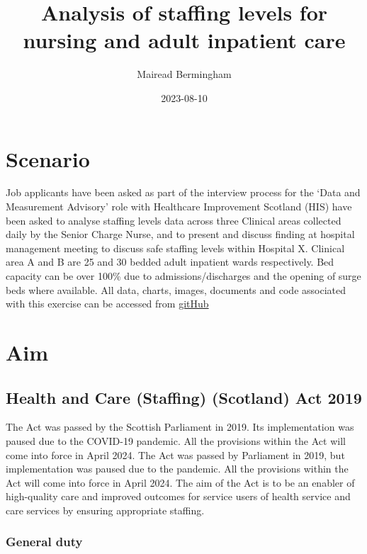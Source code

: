 \documentclass[
]{article}
\title{Analysis of staffing levels for nursing and adult inpatient care}
\author{Mairead Bermingham}
\date{2023-08-10}
\begin{document}
\maketitle

\hypertarget{scenario}{%
\section{Scenario}\label{scenario}}

Job applicants have been asked as part of the interview process for the
`Data and Measurement Advisory' role with Healthcare Improvement
Scotland (HIS) have been asked to analyse staffing levels data across
three Clinical areas collected daily by the Senior Charge Nurse, and to
present and discuss finding at hospital management meeting to discuss
safe staffing levels within Hospital X. Clinical area A and B are 25 and
30 bedded adult inpatient wards respectively. Bed capacity can be over
100\% due to admissions/discharges and the opening of surge beds where
available. All data, charts, images, documents and code associated with
this exercise can be accessed from
\href{https://github.com/MaireadLBermingham/Staffing_levels_for_Nursing_and_Adult_Inpatient_Care_Quality_and_Safety.git}{gitHub}

\hypertarget{aim}{%
\section{Aim}\label{aim}}

\hypertarget{health-and-care-staffing-scotland-act-2019}{%
\subsection{Health and Care (Staffing) (Scotland) Act
2019}\label{health-and-care-staffing-scotland-act-2019}}

The Act was passed by the Scottish Parliament in 2019. Its
implementation was paused due to the COVID-19 pandemic. All the
provisions within the Act will come into force in April 2024. The Act
was passed by Parliament in 2019, but implementation was paused due to
the pandemic. All the provisions within the Act will come into force in
April 2024. The aim of the Act is to be an enabler of high-quality care
and improved outcomes for service users of health service and care
services by ensuring appropriate staffing.

\hypertarget{general-duty}{%
\subsubsection{General duty}\label{general-duty}}
\end{document}
